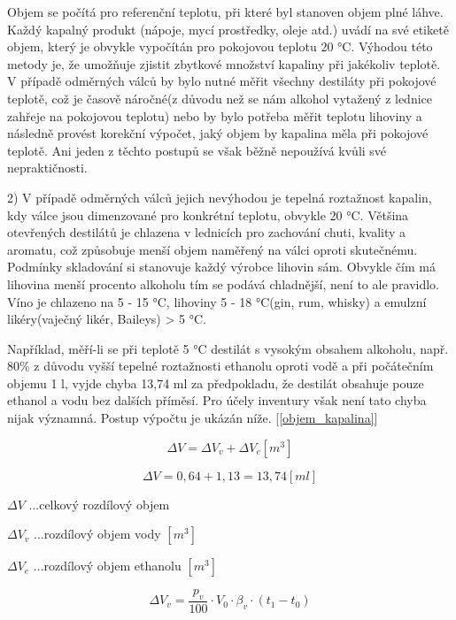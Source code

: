 Objem se počítá pro referenční teplotu, při které byl stanoven objem plné láhve. Každý kapalný produkt (nápoje, mycí prostředky, oleje atd.) uvádí na své etiketě objem, který je obvykle vypočítán pro pokojovou teplotu 20 °C. Výhodou této metody je, že umožňuje zjistit zbytkové množství kapaliny při jakékoliv teplotě. V případě odměrných válců by bylo nutné měřit všechny destiláty při pokojové teplotě, což je časově náročné(z důvodu než se nám alkohol vytažený z lednice zahřeje na pokojovou teplotu) nebo by bylo potřeba měřit teplotu lihoviny a následně provést korekční výpočet, jaký objem by kapalina měla při pokojové teplotě. Ani jeden z těchto postupů se však běžně nepoužívá kvůli své nepraktičnosti.

2)
V případě odměrných válců jejich nevýhodou je tepelná roztažnost kapalin, kdy válce jsou dimenzované pro konkrétní teplotu, obvykle 20 °C. Většina otevřených destilátů je chlazena v lednicích pro zachování chuti, kvality a aromatu, což způsobuje menší objem naměřený na válci oproti skutečnému. Podmínky skladování si stanovuje každý výrobce lihovin sám. Obvykle čím má lihovina menší procento alkoholu tím se podává chladnější, není to ale pravidlo. Víno je chlazeno na 5 - 15 °C, lihoviny 5 - 18 °C(gin, rum, whisky) a emulzní likéry(vaječný likér, Baileys) > 5 °C.

Například, měří-li se při teplotě 5 °C destilát s vysokým obsahem alkoholu, např. 80\% z důvodu vyšší tepelné roztažnosti ethanolu oproti vodě a při počátečním objemu 1 l, vyjde chyba 13,74 ml za předpokladu, že destilát obsahuje pouze ethanol a vodu bez dalších příměsí. Pro účely inventury však není tato chyba nijak významná. Postup výpočtu je ukázán níže. [\ref{objem_kapalina}]

\begin{equation}
\label{objem_kapalina}
    \Delta V = \Delta V_v + \Delta V_e \left[m^3\right]
\end{equation}


\[\Delta V = 0,64 + 1,13 = 13,74 \left[ml\right]\]


\(\Delta V\) ...celkový rozdílový objem

\(\Delta V_{v}\) ...rozdílový objem vody \([m^3]\)

\(\Delta V_{e}\) ...rozdílový objem ethanolu \([m^3]\)


\begin{equation}
    \Delta V_v = \frac{p_v}{100} \cdot V_0 \cdot \beta_v \cdot (t_1 - t_0)
\end{equation}

